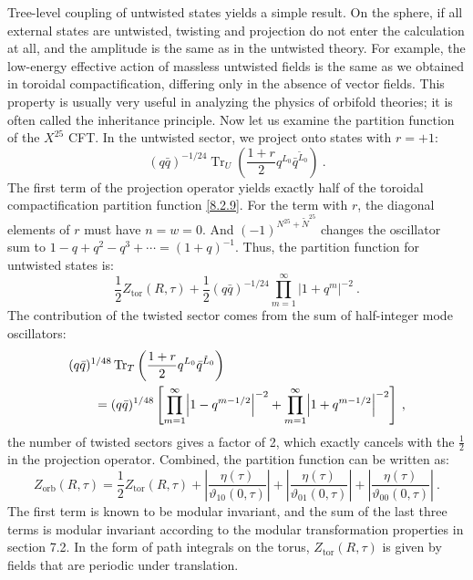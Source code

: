 Tree-level coupling of untwisted states yields a simple result. On the sphere, if all external states are untwisted, twisting and projection do not enter the calculation at all, and the amplitude is the same as in the untwisted theory. 
For example, the low-energy effective action of massless untwisted fields is the same as we obtained in toroidal compactification, differing only in the absence of vector fields. 
This property is usually very useful in analyzing the physics of orbifold theories; it is often called the inheritance principle. 
Now let us examine the partition function of the $X^{25}$ CFT. In the untwisted sector, we project onto states with $r=+1$:
\begin{equation}
	(q \bar{q})^{-1 / 24} \operatorname{Tr}_{U}\left(\frac{1+r}{2} q^{L_{0}} \bar{q}^{\tilde{L}_{0}}\right) \:. \label{8.5.9}
\end{equation}
The first term of the projection operator yields exactly half of the toroidal compactification partition function \eqref{8.2.9}. For the term with $r$, the diagonal elements of $r$ must have $n=w=0$. 
And $(-1)^{N^{25}+\tilde{N}^{25}}$ changes the oscillator sum to $1-q+q^{2}-q^{3}+\cdots=(1+q)^{-1}$. 
Thus, the partition function for untwisted states is:
\begin{equation}
	\frac{1}{2} Z_{\mathrm{tor}}(R, \tau)+\frac{1}{2}(q \bar{q})^{-1/24} \prod_{m=1}^{\infty}|1+q^{m}|^{-2} \:. \label{8.5.10}
\end{equation}
The contribution of the twisted sector comes from the sum of half-integer mode oscillators:
\begin{align}
	&(q \bar{q})^{1/48} \operatorname{Tr}_{T}\left(\frac{1+r}{2} q^{L_{0}} \bar{q}^{\tilde{L}_{0}}\right) \nonumber \\
	&\qquad =(q \bar{q})^{1/48}\left[\prod_{m=1}^{\infty}\Bigl|1-q^{m-1/2}\Bigr|^{-2} + 
	\prod_{m=1}^{\infty}\Bigl|1+q^{m-1/2}\Bigr|^{-2}\right] \:, \label{8.5.11}
\end{align}
the number of twisted sectors gives a factor of 2, which exactly cancels with the $\frac{1}{2}$ in the projection operator. 
Combined, the partition function can be written as:
\begin{equation}
	Z_{\text{orb}}(R, \tau)=\frac{1}{2} Z_{\text{tor}}(R, \tau) + \left|\frac{\eta(\tau)}{\vartheta_{10}(0, \tau)}\right|
	+ \left|\frac{\eta(\tau)}{\vartheta_{01}(0, \tau)}\right|+\left|\frac{\eta(\tau)}{\vartheta_{00}(0, \tau)}\right| \:. \label{8.5.12}
\end{equation}
The first term is known to be modular invariant, and the sum of the last three terms is modular invariant according to the modular transformation properties in section 7.2. In the form of path integrals on the torus, $Z_{\text{tor}}(R, \tau)$ is given by fields that are periodic under translation. 
